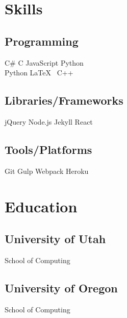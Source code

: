 \documentclass[]{plushcv}
\begin{document}
\begin{paracol}{2}


\section{Skills}
\subsection{Programming}
\sectionsep
{}
C\# \textbullet{} C \textbullet{} JavaScript \textbullet{} Python \\
\sectionsep
{}
Python \textbullet{} \LaTeX\ \textbullet{}  C++  \\
\sectionsep
\sectionsep
\subsection{Libraries/Frameworks}
\sectionsep
jQuery \textbullet{} Node.js \textbullet{} Jekyll \textbullet{} React \\
\sectionsep
\sectionsep
\subsection{Tools/Platforms}
\sectionsep
Git \textbullet{} Gulp \textbullet{} Webpack \textbullet{} Heroku    \\ 

\sectionsep


\section{Education} 
\subsection{University of Utah}
School of Computing \\

\sectionsep
\subsection{University of Oregon}
School of Computing \\
\sectionsep


\end{paracol}
\end{document}
